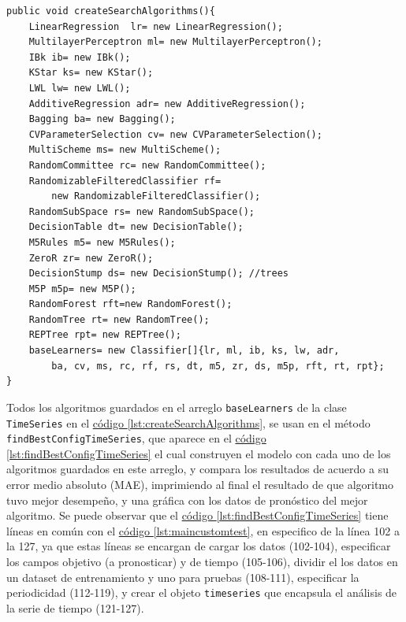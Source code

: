 \begin{lstlisting}[frame=single]  
public void createSearchAlgorithms(){
	LinearRegression  lr= new LinearRegression();
	MultilayerPerceptron ml= new MultilayerPerceptron();
	IBk ib= new IBk();
	KStar ks= new KStar();
	LWL lw= new LWL();
	AdditiveRegression adr= new AdditiveRegression();
	Bagging ba= new Bagging();
	CVParameterSelection cv= new CVParameterSelection();
	MultiScheme ms= new MultiScheme();
	RandomCommittee rc= new RandomCommittee();
	RandomizableFilteredClassifier rf= 
		new RandomizableFilteredClassifier();
	RandomSubSpace rs= new RandomSubSpace();
	DecisionTable dt= new DecisionTable();
	M5Rules m5= new M5Rules();
	ZeroR zr= new ZeroR();
	DecisionStump ds= new DecisionStump(); //trees
	M5P m5p= new M5P();
	RandomForest rft=new RandomForest();
	RandomTree rt= new RandomTree();
	REPTree rpt= new REPTree();
	baseLearners= new Classifier[]{lr, ml, ib, ks, lw, adr,
		ba, cv, ms, rc, rf, rs, dt, m5, zr, ds, m5p, rft, rt, rpt};
}
\end{lstlisting}

Todos los algoritmos guardados en el arreglo \texttt{baseLearners} de la clase \texttt{TimeSeries} en el \hyperref[lst:createSearchAlgorithms]{ código \ref{lst:createSearchAlgorithms}}, se usan en el método \texttt{findBestConfigTimeSeries}, que aparece en el 
\hyperref[lst:findBestConfigTimeSeries]{ código \ref{lst:findBestConfigTimeSeries}} el cual construyen el modelo con cada uno de los algoritmos guardados en este arreglo, y compara los resultados de acuerdo a su error medio absoluto (MAE), imprimiendo al final el resultado de que algoritmo tuvo mejor desempeño, y una gráfica con los datos de pronóstico del mejor algoritmo.
Se puede observar que el 
\hyperref[lst:findBestConfigTimeSeries]{ código \ref{lst:findBestConfigTimeSeries}} tiene líneas en común con 
el \hyperref[lst:maincustomtest]{ código \ref{lst:maincustomtest}}, en especifico de la línea 102 a la 127, ya que estas líneas se encargan de cargar los datos (102-104), especificar los campos objetivo (a pronosticar) y de tiempo (105-106), dividir el los datos en un dataset de entrenamiento y uno para pruebas (108-111), especificar la periodicidad (112-119), y crear el objeto \texttt{timeseries} que encapsula el análisis de la serie de tiempo (121-127).


